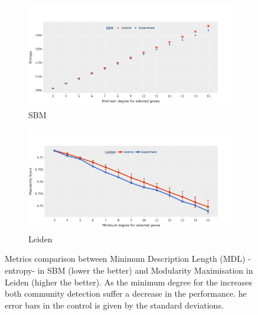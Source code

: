\begin{figure}[!h]
    \captionsetup[subfigure]{justification=Centering}
    \begin{subfigure}[!t]{0.5\textwidth}
        \includegraphics[width=\textwidth]{Sections/Network_I/Resources/selective_pruning/sbm_ent_sel_prun.png}
        \caption{SBM}
        \label{fig:N_I:sbm_com_det_met}
    \end{subfigure}\hspace{\fill} 
    \begin{subfigure}[!t]{0.5\textwidth}
        \includegraphics[width=\linewidth]{Sections/Network_I/Resources/selective_pruning/leid_mod_sel_prun.png}
        \caption{Leiden}
        \label{fig:N_I:leid_com_det_met}
    \end{subfigure}
    \caption{Metrics comparison between Minimum Description Length (MDL) - entropy- in SBM (lower the better) and Modularity Maximisation in Leiden (higher the better). As the minimum degree for the increases both community detection suffer a decrease in the performance. he error bars in the control is given by the standard deviations.}
    \label{fig:N_I:com_det_met}
\end{figure}

